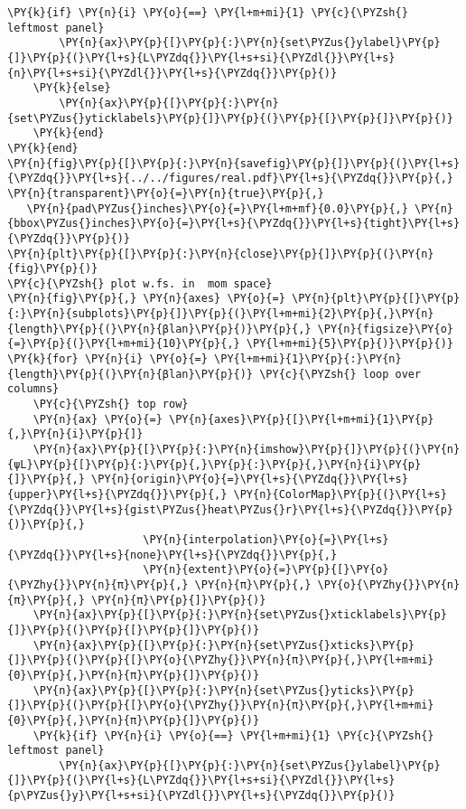 \begin{Verbatim}[commandchars=\\\{\}]
    \PY{k}{if} \PY{n}{i} \PY{o}{==} \PY{l+m+mi}{1} \PY{c}{\PYZsh{} leftmost panel}
        \PY{n}{ax}\PY{p}{[}\PY{p}{:}\PY{n}{set\PYZus{}ylabel}\PY{p}{]}\PY{p}{(}\PY{l+s}{L\PYZdq{}}\PY{l+s+si}{\PYZdl{}}\PY{l+s}{n}\PY{l+s+si}{\PYZdl{}}\PY{l+s}{\PYZdq{}}\PY{p}{)}
    \PY{k}{else}
        \PY{n}{ax}\PY{p}{[}\PY{p}{:}\PY{n}{set\PYZus{}yticklabels}\PY{p}{]}\PY{p}{(}\PY{p}{[}\PY{p}{]}\PY{p}{)}
    \PY{k}{end}
\PY{k}{end}
\PY{n}{fig}\PY{p}{[}\PY{p}{:}\PY{n}{savefig}\PY{p}{]}\PY{p}{(}\PY{l+s}{\PYZdq{}}\PY{l+s}{../../figures/real.pdf}\PY{l+s}{\PYZdq{}}\PY{p}{,} \PY{n}{transparent}\PY{o}{=}\PY{n}{true}\PY{p}{,}
   \PY{n}{pad\PYZus{}inches}\PY{o}{=}\PY{l+m+mf}{0.0}\PY{p}{,} \PY{n}{bbox\PYZus{}inches}\PY{o}{=}\PY{l+s}{\PYZdq{}}\PY{l+s}{tight}\PY{l+s}{\PYZdq{}}\PY{p}{)}
\PY{n}{plt}\PY{p}{[}\PY{p}{:}\PY{n}{close}\PY{p}{]}\PY{p}{(}\PY{n}{fig}\PY{p}{)}
\PY{c}{\PYZsh{} plot w.fs. in  mom space}
\PY{n}{fig}\PY{p}{,} \PY{n}{axes} \PY{o}{=} \PY{n}{plt}\PY{p}{[}\PY{p}{:}\PY{n}{subplots}\PY{p}{]}\PY{p}{(}\PY{l+m+mi}{2}\PY{p}{,}\PY{n}{length}\PY{p}{(}\PY{n}{βlan}\PY{p}{)}\PY{p}{,} \PY{n}{figsize}\PY{o}{=}\PY{p}{(}\PY{l+m+mi}{10}\PY{p}{,} \PY{l+m+mi}{5}\PY{p}{)}\PY{p}{)}
\PY{k}{for} \PY{n}{i} \PY{o}{=} \PY{l+m+mi}{1}\PY{p}{:}\PY{n}{length}\PY{p}{(}\PY{n}{βlan}\PY{p}{)} \PY{c}{\PYZsh{} loop over columns}
    \PY{c}{\PYZsh{} top row}
    \PY{n}{ax} \PY{o}{=} \PY{n}{axes}\PY{p}{[}\PY{l+m+mi}{1}\PY{p}{,}\PY{n}{i}\PY{p}{]}
    \PY{n}{ax}\PY{p}{[}\PY{p}{:}\PY{n}{imshow}\PY{p}{]}\PY{p}{(}\PY{n}{ψL}\PY{p}{[}\PY{p}{:}\PY{p}{,}\PY{p}{:}\PY{p}{,}\PY{n}{i}\PY{p}{]}\PY{p}{,} \PY{n}{origin}\PY{o}{=}\PY{l+s}{\PYZdq{}}\PY{l+s}{upper}\PY{l+s}{\PYZdq{}}\PY{p}{,} \PY{n}{ColorMap}\PY{p}{(}\PY{l+s}{\PYZdq{}}\PY{l+s}{gist\PYZus{}heat\PYZus{}r}\PY{l+s}{\PYZdq{}}\PY{p}{)}\PY{p}{,}
                     \PY{n}{interpolation}\PY{o}{=}\PY{l+s}{\PYZdq{}}\PY{l+s}{none}\PY{l+s}{\PYZdq{}}\PY{p}{,}
                     \PY{n}{extent}\PY{o}{=}\PY{p}{[}\PY{o}{\PYZhy{}}\PY{n}{π}\PY{p}{,} \PY{n}{π}\PY{p}{,} \PY{o}{\PYZhy{}}\PY{n}{π}\PY{p}{,} \PY{n}{π}\PY{p}{]}\PY{p}{)}
    \PY{n}{ax}\PY{p}{[}\PY{p}{:}\PY{n}{set\PYZus{}xticklabels}\PY{p}{]}\PY{p}{(}\PY{p}{[}\PY{p}{]}\PY{p}{)}
    \PY{n}{ax}\PY{p}{[}\PY{p}{:}\PY{n}{set\PYZus{}xticks}\PY{p}{]}\PY{p}{(}\PY{p}{[}\PY{o}{\PYZhy{}}\PY{n}{π}\PY{p}{,}\PY{l+m+mi}{0}\PY{p}{,}\PY{n}{π}\PY{p}{]}\PY{p}{)}
    \PY{n}{ax}\PY{p}{[}\PY{p}{:}\PY{n}{set\PYZus{}yticks}\PY{p}{]}\PY{p}{(}\PY{p}{[}\PY{o}{\PYZhy{}}\PY{n}{π}\PY{p}{,}\PY{l+m+mi}{0}\PY{p}{,}\PY{n}{π}\PY{p}{]}\PY{p}{)}
    \PY{k}{if} \PY{n}{i} \PY{o}{==} \PY{l+m+mi}{1} \PY{c}{\PYZsh{} leftmost panel}
        \PY{n}{ax}\PY{p}{[}\PY{p}{:}\PY{n}{set\PYZus{}ylabel}\PY{p}{]}\PY{p}{(}\PY{l+s}{L\PYZdq{}}\PY{l+s+si}{\PYZdl{}}\PY{l+s}{p\PYZus{}y}\PY{l+s+si}{\PYZdl{}}\PY{l+s}{\PYZdq{}}\PY{p}{)}

\end{Verbatim}
